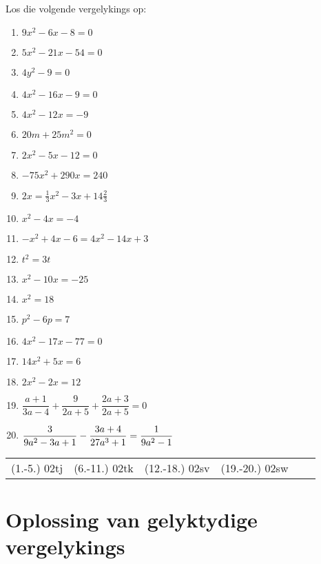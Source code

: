 \begin{exercises}{}

{Los die volgende vergelykings op:
\begin{multicols}{2}
\begin{enumerate}[itemsep=5pt, label=\textbf{\arabic*}. ] 
\item  $9x^{2}-6x-8=0$%
\item  $5x^{2}-21x-54=0$%
\item  $4y^{2}-9=0$%
\item  $4x^{2}-16x-9=0$%
\item  $4x^{2}-12x=-9$%
\item  $20m+25{m}^{2}=0$
\item  $2{x}^{2}-5x-12=0$  
\item  $-75{x}^{2}+290x=240$
\item  $2x=\frac{1}{3}{x}^{2}-3x+14\frac{2}{3}$
\item  ${x}^{2}-4x=-4$      
\item  $-{x}^{2}+4x-6=4{x}^{2}-14x+3$       
\item  ${t}^{2}=3t$  
\item  ${x}^{2}-10x=-25$      
\item  ${x}^{2}=18$
\item  ${p}^{2}-6p=7$
\item  $4{x}^{2}-17x-77=0$
\item  $14{x}^{2}+5x=6$
\item  $2{x}^{2}-2x=12$  
\item  \small{$\dfrac{a+1}{3a-4}+\dfrac{9}{2a+5}+\dfrac{2a+3}{2a+5}=0$}
\item  $\dfrac{3}{9a^2-3a+1}-\dfrac{3a+4}{27a^3+1}\\[4pt]=\dfrac{1}{9a^2-1}$          
\end{enumerate}
\end{multicols}
\practiceinfo
\par 
\par\begin{tabular}[h]{cccccc}
(1.-5.) 02tj &  (6.-11.) 02tk &  (12.-18.) 02sv & (19.-20.) 02sw &\end{tabular}
}
\end{exercises}


\section{Oplossing van gelyktydige vergelykings}



